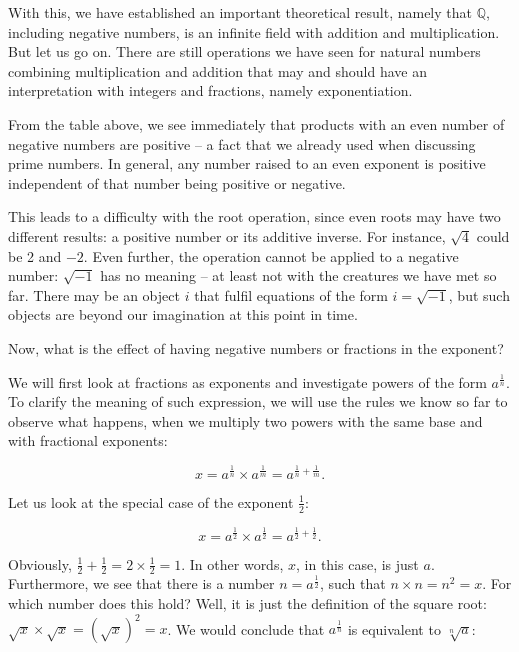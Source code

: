 \documentclass[tikz]{scrreprt}
\begin{document}
With this, we have established an important theoretical 
result, namely that $\mathbb{Q}$, including negative numbers,
is an infinite field with addition and multiplication.
But let us go on. 
There are still operations we have seen
for natural numbers combining multiplication and addition
that may and should have an interpretation with integers
and fractions, namely exponentiation.

From the table above, we see immediately
that products with an even number of negative
numbers are positive -- a fact that we already
used when discussing prime numbers.
In general, any number raised to an
even exponent is positive independent of that number
being positive or negative.

This leads to a difficulty with the 
root operation, since even roots may have
two different results: a positive number
or its additive inverse. For instance, $\sqrt{4}$
could be 2 and $-2$. 
Even further, the operation cannot be applied
to a negative number: $\sqrt{-1}$ has no
meaning -- at least not with the creatures
we have met so far. There may be an object $i$
that fulfil equations of the form $i = \sqrt{-1}$,
but such objects are beyond our imagination
at this point in time.

Now, what is the effect of having negative numbers or fractions
in the exponent?

We will first look at fractions as exponents and
investigate powers of the form
$a^{\frac{1}{n}}$. To clarify the meaning of such expression,
we will use the rules we know so far to observe what happens,
when we multiply two powers with the same base and with fractional exponents:

\begin{equation}\label{eq_invelfracExp1}
x = a^{\frac{1}{n}} \times a^{\frac{1}{m}} = a^{\frac{1}{n} + \frac{1}{m}}.
\end{equation}

Let us look at the special case of the exponent $\frac{1}{2}$:

\begin{equation}
x = a^{\frac{1}{2}} \times a^{\frac{1}{2}} = a^{\frac{1}{2} + \frac{1}{2}}.
\end{equation}

Obviously, $\frac{1}{2} + \frac{1}{2} = 2 \times \frac{1}{2} = 1$.
In other words, $x$, in this case, 
is just $a$. Furthermore, we see 
that there is a number $n = a^{\frac{1}{2}}$, 
such that $n \times n = n^2 = x$.
For which number does this hold?
Well, it is just the definition of the square root:
$\sqrt{x} \times \sqrt{x} = (\sqrt{x})^2 = x$. 
We would conclude that $a^{\frac{1}{n}}$ is equivalent to
$\sqrt[n]{a}$:
\end{document}
